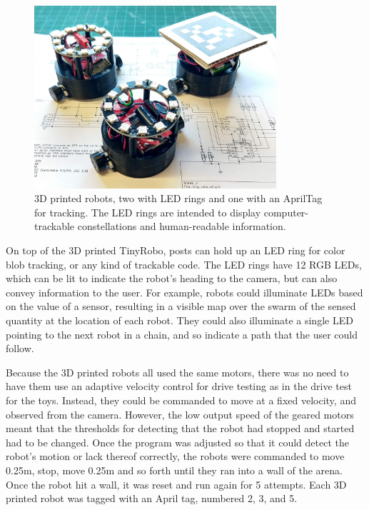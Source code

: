 \begin{figure}
	\centering
	\includegraphics[width=0.8\textwidth]{../3dp_robo.png}
	\caption{3D printed robots, two with LED rings and one with an AprilTag for tracking. The LED rings are intended to display computer-trackable constellations and human-readable information.}
	\label{fig:3dp_robos}
\end{figure}

On top of the 3D printed TinyRobo, posts can hold up an LED ring for color blob tracking, or any kind of trackable code. 
The LED rings have 12 RGB LEDs, which can be lit to indicate the robot's heading to the camera, but can also convey information to the user. 
For example, robots could illuminate LEDs based on the value of a sensor, resulting in a visible map over the swarm of the sensed quantity at the location of each robot. 
They could also illuminate a single LED pointing to the next robot in a chain, and so indicate a path that the user could follow.

Because the 3D printed robots all used the same motors, there was no need to have them use an adaptive velocity control for drive testing as in the drive test for the toys. 
Instead, they could be commanded to move at a fixed velocity, and observed from the camera. 
However, the low output speed of the geared motors meant that the thresholds for detecting that the robot had stopped and started had to be changed. 
Once the program was adjusted so that it could detect the robot's motion or lack thereof correctly, the robots were commanded to move 0.25m, stop, move 0.25m and so forth until they ran into a wall of the arena. 
Once the robot hit a wall, it was reset and run again for 5 attempts. 
Each 3D printed robot was tagged with an April tag, numbered 2, 3, and 5. 

